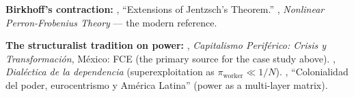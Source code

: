 \documentclass[../structural_economics_book.tex]{subfiles}
\begin{document}
\textbf{Birkhoff's contraction:} \citet{birkhoff1957extensions}, ``Extensions of Jentzsch's Theorem.'' \citet{lemmens2012nonlinear}, \textit{Nonlinear Perron-Frobenius Theory} --- the modern reference.

\textbf{The structuralist tradition on power:} \citet{prebisch1981capitalismo}, \textit{Capitalismo Perif\'{e}rico: Crisis y Transformaci\'{o}n}, M\'{e}xico: FCE (the primary source for the case study above). \citet{marini1973dialectica}, \textit{Dial\'{e}ctica de la dependencia} (superexploitation as $\pi_{\text{worker}} \ll 1/N$). \citet{quijano2000colonialidad}, ``Colonialidad del poder, eurocentrismo y Am\'{e}rica Latina'' (power as a multi-layer matrix).
\end{document}
